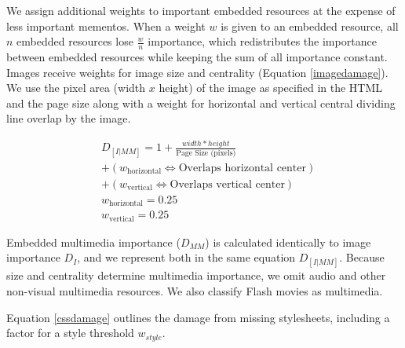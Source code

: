 We assign additional weights to important embedded resources at the expense of less important mementos. When a weight $w$ is given to an embedded resource, all $n$ embedded resources lose $\frac{w}{n}$ importance, which redistributes the importance between embedded resources while keeping the sum of all importance constant. Images receive weights for image size and centrality (Equation \ref{imagedamage}). We use the pixel area (width $x$ height) of the image as specified in the HTML and the page size along with a weight for horizontal and vertical central dividing line overlap by the image.

\begin{equation}
\label{imagedamage}
\begin{split}
&D_{[I|MM]} = 1 + \frac{width * height}{\text{Page Size (pixels)}}\\ &+ (w_{\text{horizontal}} \iff \text{Overlaps horizontal center})\\
&+ (w_{\text{vertical}} \iff \text{Overlaps vertical center})\\
&w_{\text{horizontal}} = 0.25\\
&w_{\text{vertical}} = 0.25
\end{split}
\end{equation}


Embedded multimedia importance ($D_{MM}$) is calculated identically to image importance $D_I$, and we represent both in the same equation $D_{[I|MM]}$. Because size and centrality determine multimedia importance, we omit audio and other non-visual multimedia resources. We also classify Flash movies as multimedia.



Equation \ref{cssdamage} outlines the damage from missing stylesheets, including a factor for a style threshold $w_{style}$. 


